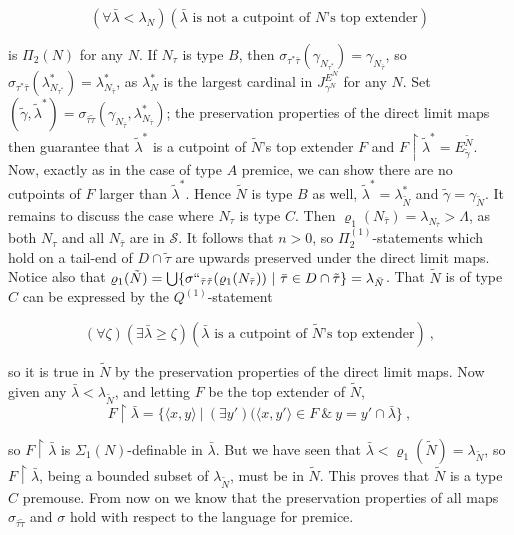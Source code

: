 \documentclass[12pt]{article}
\begin{document}
\[
(\forall \bar{\lambda} < \lambda_N ) (\bar{\lambda} \text{ is not a cutpoint of $N$'s top extender})
\]

is $\Pi_2 (N)$ for any $N$.  If $N_\tau$ is type $B$, then $\sigma_{\tau^* \bar{\tau}} ( \gamma_{N_{\tau^*}} ) = \gamma_{N_{\bar{\tau}}}$, so $\sigma_{\tau^* \bar{\tau}} ( \lambda^*_{N_{\tau^*}}) = \lambda^*_{N_{\bar{\tau}}}$, as $\lambda^*_N$ is the largest cardinal in $J_{\gamma^N}^{E^N}$ for any $N$.  Set $(\tilde{\gamma} , \tilde{\lambda}^*) = \sigma_{ \bar{\tau} \tilde{\tau}} ( \gamma_{N_{\bar{\tau}}} , \lambda_{N_{\bar{\tau}}}^* )$; the preservation properties of the direct limit maps then guarantee that $\tilde{\lambda}^*$ is a cutpoint of $\tilde{N}$'s top extender $F$ and $F \restriction \tilde{\lambda}^* = E^{\tilde{N}}_{\tilde{\gamma}}$.  Now, exactly as in the case of type $A$ premice, we can show there are no cutpoints of $F$ larger than $\tilde{\lambda}^*$.  Hence $\tilde{N}$ is type $B$ as well, $\tilde{\lambda}^* = \lambda_{\tilde{N}}^*$ and $\tilde{\gamma} = \gamma_{\tilde{N}}$.  It remains to discuss the case where $N_\tau$ is type $C$.  Then $\varrho_1 (N_{\bar{\tau}}) = \lambda_{N_{\bar{\tau}}} > \Lambda$, as both $N_\tau$ and all $N_{\bar{\tau}}$ are in $\mathcal{S}$.  It follows that $n > 0$, so $\Pi_2^{(1)}$-statements which hold on a tail-end of $D \cap \tilde{\tau}$ are upwards preserved under the direct limit maps.  Notice also that $\varrho_1 (\tilde{N}) = \bigcup \{ \sigma``_{\bar{\tau} \tilde{\tau}} ( \varrho_1 (N_{\bar{\tau}}) ) \ | \ \bar{\tau} \in D \cap \tilde{\tau} \} = \lambda_{\bar{N}}$.  That $\tilde{N}$ is of type $C$ can be expressed by the $Q^{(1)}$-statement

\[
(\forall \zeta) (\exists \bar{\lambda} \geq \zeta ) (\bar{\lambda} \text{ is a cutpoint of $\tilde{N}$'s top extender}) \ ,
\]

so it is true in $\tilde{N}$ by the preservation properties of the direct limit maps.  Now given any $\bar{\lambda} < \lambda_{\tilde{N}}$, and letting $F$ be the top extender of $\tilde{N}$,\\

\[
F \restriction \bar{\lambda} = \{ \langle x , y \rangle \ | \ ( \exists y' ) ( \langle x , y' \rangle \in F \ \& \ y = y' \cap \bar{\lambda} \} \ ,
\]

so $F \restriction \bar{\lambda}$ is $\Sigma_1 (N)$-definable in $\bar{\lambda}$.  But we have seen that $\bar{\lambda} < \varrho_1 (\tilde{N}) = \lambda_{\tilde{N}}$, so $F \restriction \bar{\lambda}$, being a bounded subset of $\lambda_{\tilde{N}}$, must be in $\tilde{N}$.  This proves that $\tilde{N}$ is a type $C$ premouse.  From now on we know that the preservation properties of all maps $\sigma_{\bar{\tau} \tilde{\tau}}$ and $\sigma$ hold with respect to the language for premice.\\
\end{document}
